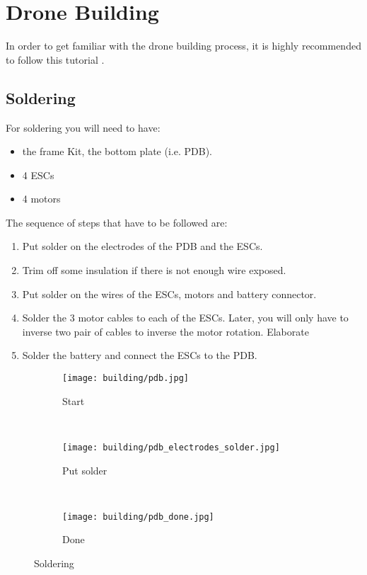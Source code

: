 \chapter{Drone Building}
In order to get familiar with the drone building process, it is highly recommended to follow this tutorial \cite{udemy_build_course}.

\section{Soldering}
For soldering you will need to have:
\begin{itemize}
    \item the frame Kit, the bottom plate (i.e. PDB).
    \item 4 ESCs
    \item 4 motors
\end{itemize}
The sequence of steps that have to be followed are:
\begin{enumerate}
    \item Put solder on the electrodes of the PDB and the ESCs.
    \item Trim off some insulation if there is not enough wire exposed.
    \item Put solder on the wires of the ESCs, motors and battery connector.
    \item Solder the 3 motor cables to each of the ESCs. Later, you will only have to inverse two pair of cables to inverse the motor rotation. {\color{orange} Elaborate}
    \item Solder the battery and connect the ESCs to the PDB.
\end{enumerate}
\begin{figure}[!ht]
    \centering
    \begin{subfigure}[b]{0.3\textwidth}
        \texttt{[image: building/pdb.jpg]}
        \caption{Start}
        \label{fig:pdb}
    \end{subfigure}
    ~
    \begin{subfigure}[b]{0.3\textwidth}
        \texttt{[image: building/pdb\_electrodes\_solder.jpg]}
        \caption{Put solder}
        \label{fig:pdb_electrodes_solder}
    \end{subfigure}
    ~
    \begin{subfigure}[b]{0.3\textwidth}
        \texttt{[image: building/pdb\_done.jpg]}
        \caption{Done}
        \label{fig:pdb_done}
    \end{subfigure}
    \caption{Soldering}\label{fig:soldering}
\end{figure}


